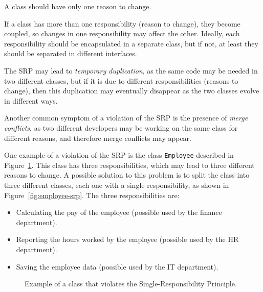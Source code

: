 \begin{principio}
    A class should have only one reason to change.
\end{principio}

If a class has more than one responsibility (reason to change), they become coupled, so changes in one responsibility may affect the other. Ideally, each responsibility should be encapsulated in a separate class, but if not, at least they should be separated in different interfaces.

The SRP may lead to \emph{temporary duplication}, as the same code may be needed in two different classes, but if it is due to different responsibilities (reasons to change), then this duplication may eventually disappear as the two classes evolve in different ways.

Another common symptom of a violation of the SRP is the presence of \emph{merge conflicts}, as two different developers may be working on the same class for different reasons, and therefore merge conflicts may appear.

One example of a violation of the SRP is the class \texttt{Employee} described in Figure~\ref{fig:employee}. This class has three responsibilities, which may lead to three different reasons to change. A possible solution to this problem is to split the class into three different classes, each one with a single responsibility, as shown in Figure~\ref{fig:employee-srp}. The three responsibilities are:
\begin{itemize}
    \item Calculating the pay of the employee (possible used by the finance department).
    \item Reporting the hours worked by the employee (possible used by the HR department).
    \item Saving the employee data (possible used by the IT department).
\end{itemize}
\begin{figure}
    \centering
    \caption{Example of a class that violates the Single-Responsibility Principle.}
    \label{fig:employee}
\end{figure}

